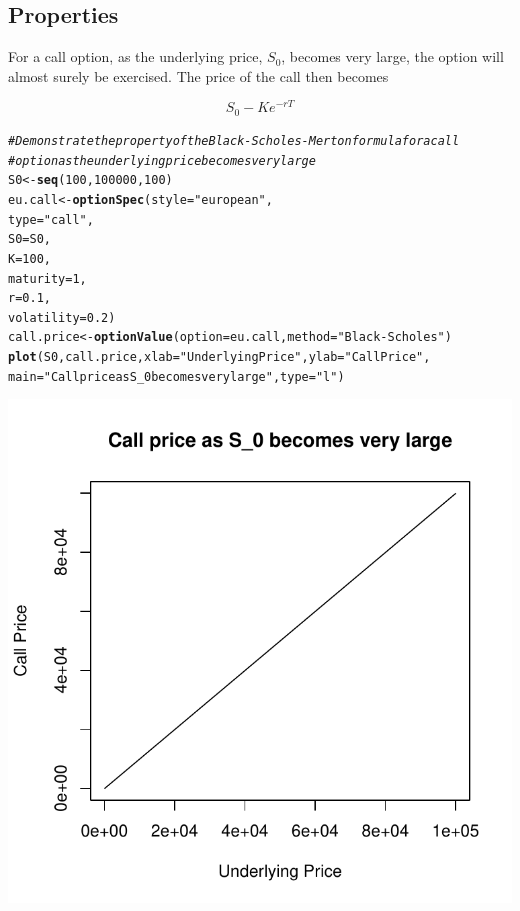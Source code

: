 \documentclass{article}\usepackage[]{graphicx}\usepackage[]{color}
\makeatletter
\def\maxwidth{ %
  \ifdim\Gin@nat@width>\linewidth
    \linewidth
  \else
    \Gin@nat@width
  \fi
}
\newcommand{\hlstr}[1]{\textcolor[rgb]{0.192,0.494,0.8}{#1}}%
\newcommand{\hlcom}[1]{\textcolor[rgb]{0.678,0.584,0.686}{\textit{#1}}}%
\newcommand{\hlkwd}[1]{\textcolor[rgb]{0.737,0.353,0.396}{\textbf{#1}}}%
\newenvironment{kframe}{%
 \def\at@end@of@kframe{}%
 \ifinner\ifhmode%
  \def\at@end@of@kframe{\end{minipage}}%
  \begin{minipage}{\columnwidth}%
 \fi\fi%
 \def\FrameCommand##1{\hskip\@totalleftmargin \hskip-\fboxsep
 \colorbox{shadecolor}{##1}\hskip-\fboxsep
     \hskip-\linewidth \hskip-\@totalleftmargin \hskip\columnwidth}%
 \MakeFramed {\advance\hsize-\width
   \@totalleftmargin\z@ \linewidth\hsize
   \@setminipage}}%
 {\par\unskip\endMakeFramed%
 \at@end@of@kframe}
\newenvironment{knitrout}{}{} %
\makeatother
\begin{document}
\subsection{Properties}
For a call option, as the underlying price, $S_0$, becomes very large, the option will almost surely be exercised. The price of the call then becomes

\begin{equation*}
S_0 - K e^{-r T}
\end{equation*}

\begin{knitrout}
\color{fgcolor}\begin{kframe}
\begin{alltt}
\hlcom{# Demonstrate the property of the Black-Scholes-Merton formula for a call }
\hlcom{# option as the underlying price becomes very large}
S0 <- \hlkwd{seq}(100, 100000, 100)
eu.call <- \hlkwd{optionSpec}(style = \hlstr{"european"}, 
                      type = \hlstr{"call"}, 
                      S0 = S0,
                      K = 100,
                      maturity = 1, 
                      r = 0.1, 
                      volatility = 0.2)
call.price <- \hlkwd{optionValue}(option = eu.call, method = \hlstr{"Black-Scholes"})
\hlkwd{plot}(S0, call.price, xlab=\hlstr{"Underlying Price"}, ylab=\hlstr{"Call Price"},
     main=\hlstr{"Call price as S_0 becomes very large"}, type=\hlstr{"l"})
\end{alltt}
\end{kframe}
\includegraphics[width=\maxwidth]{figure/unnamed-chunk-2} 

\end{knitrout}
\end{document}
